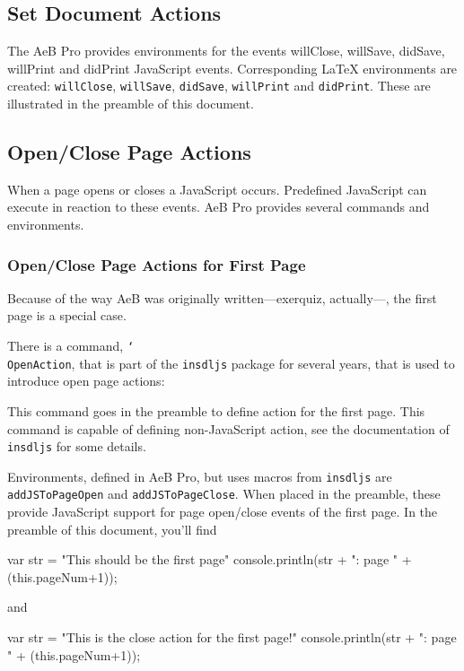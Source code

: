 \documentclass{article}
\newcommand{\cs}[1]{\texttt{\char`\\#1}}
\newenvironment{sverbatim}
{\par\footnotesize\verbatim}{\endverbatim}
\begin{document}
\subsection{Set Document Actions}

The AeB Pro provides environments for the events willClose,
willSave, didSave, willPrint and didPrint JavaScript events.
Corresponding {\LaTeX} environments are created: \texttt{willClose},
\texttt{willSave}, \texttt{didSave}, \texttt{willPrint} and
\texttt{didPrint}. These are illustrated in the preamble of this
document.

\subsection{Open/Close Page Actions}

When a page opens or closes a JavaScript occurs. Predefined JavaScript can execute
in reaction to these events. AeB Pro provides several commands and environments.

\subsubsection{Open/Close Page Actions for First Page}

Because of the way AeB was originally written---\textsf{exerquiz}, actually---,
the first page is a special case.

There is a command, \cs{OpenAction}, that is part of the \texttt{insdljs} package for several years, that
is used to introduce open page actions:

\begin{sverbatim}
\end{sverbatim}
This command goes in the preamble to define action for the first page. This command is capable of defining
non-JavaScript action, see the documentation of \texttt{insdljs} for some details.

Environments, defined in AeB Pro, but uses macros from \texttt{insdljs} are
\texttt{addJSToPageOpen} and \texttt{addJSToPageClose}.  When placed in the preamble, these
provide JavaScript support for page open/close events of the first page. In the preamble of this document, you'll find

\begin{sverbatim}
\begin{addJSToPageOpen}
var str = "This should be the first page"
console.println(str + ": page " + (this.pageNum+1));
\end{addJSToPageOpen}
\end{sverbatim}
and
\begin{sverbatim}
\begin{addJSToPageClose}
var str = "This is the close action for the first page!"
console.println(str + ": page " + (this.pageNum+1));
\end{addJSToPageClose}
\end{sverbatim}
\end{document}
